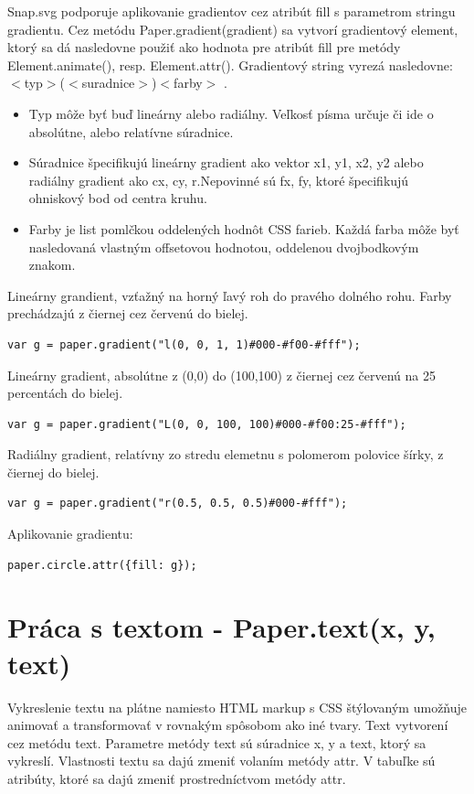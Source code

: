 Snap.svg  podporuje aplikovanie gradientov cez atribút fill s parametrom stringu gradientu. Cez metódu Paper.gradient(gradient) sa vytvorí gradientový element, ktorý sa dá nasledovne použiť ako hodnota pre atribút fill pre metódy Element.animate(), resp. Element.attr(). 
Gradientový string vyrezá nasledovne: $<$typ$>$($<$suradnice$>$)$<$farby$>$ .
\begin{itemize}
\item Typ môže byť buď lineárny alebo radiálny. Veľkosť písma určuje či ide o absolútne, alebo relatívne súradnice.
\item Súradnice špecifikujú lineárny gradient ako vektor x1, y1, x2, y2 alebo radiálny gradient ako cx, cy, r.Nepovinné sú fx, fy, ktoré špecifikujú ohniskový bod od centra kruhu. 
\item Farby je list pomlčkou oddelených hodnôt CSS farieb. Každá farba môže byť nasledovaná vlastným offsetovou hodnotou, oddelenou dvojbodkovým znakom. 
\end{itemize}

Lineárny grandient, vzťažný na horný ľavý roh do pravého dolného rohu. Farby prechádzajú z čiernej cez červenú do bielej.  
\begin{lstlisting}
var g = paper.gradient("l(0, 0, 1, 1)#000-#f00-#fff");
\end{lstlisting}

Lineárny gradient, absolútne z (0,0) do (100,100) z čiernej cez červenú na 25 percentách do bielej. 
\begin{lstlisting}
var g = paper.gradient("L(0, 0, 100, 100)#000-#f00:25-#fff");
\end{lstlisting}

Radiálny gradient, relatívny zo stredu elemetnu s polomerom polovice šírky, z čiernej do bielej. 
\begin{lstlisting}
var g = paper.gradient("r(0.5, 0.5, 0.5)#000-#fff");
\end{lstlisting}


Aplikovanie gradientu: 
\begin{lstlisting}
paper.circle.attr({fill: g});
\end{lstlisting}



\section{Práca s textom - Paper.text(x, y, text)}

Vykreslenie textu na plátne namiesto HTML markup s CSS štýlovaným umožňuje animovať a transformovať v rovnakým spôsobom ako iné tvary. Text vytvorení cez metódu text. Parametre metódy text sú súradnice x, y a text, ktorý sa vykreslí. Vlastnosti textu sa dajú zmeniť volaním metódy attr. V tabuľke sú atribúty, ktoré sa dajú zmeniť prostredníctvom metódy attr. 


